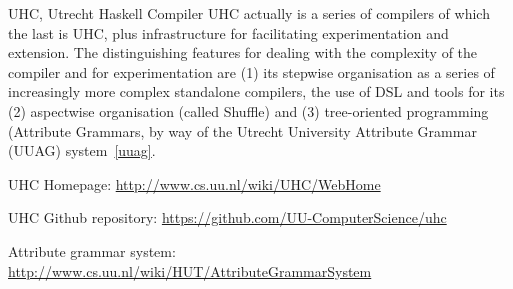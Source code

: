 \begin{hcarentry}{UHC, Utrecht Haskell Compiler}
UHC actually is a series of compilers of which the last is UHC, plus
infrastructure for facilitating experimentation and extension.
The distinguishing features for dealing with the complexity of the compiler and for experimentation are
(1) its stepwise organisation as a series of increasingly more complex standalone compilers,
the use of DSL and tools for its (2) aspectwise organisation (called Shuffle) and
(3) tree-oriented programming (Attribute Grammars, by way of the
Utrecht University Attribute Grammar (UUAG) system~\cref{uuag}.

\FurtherReading
\begin{compactitem}
\item UHC Homepage:
\url{http://www.cs.uu.nl/wiki/UHC/WebHome}

\item UHC Github repository:
\url{https://github.com/UU-ComputerScience/uhc}

\item Attribute grammar system:
\url{http://www.cs.uu.nl/wiki/HUT/AttributeGrammarSystem}

\end{compactitem}
\end{hcarentry}
